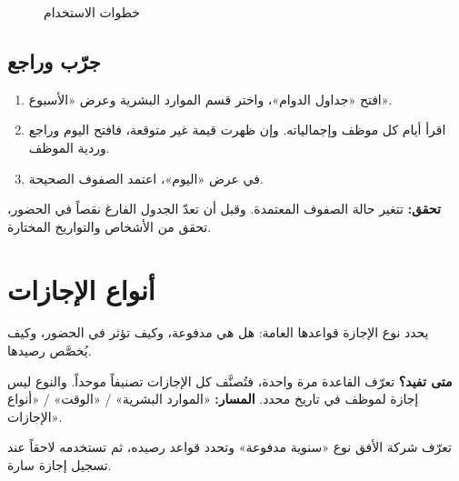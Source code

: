 \begin{figure}[H]
\centering
{}
\rclegend
\caption{خطوات الاستخدام}
\label{fig:hr-feature-timesheets-flow}
\end{figure}

\subsection{جرّب وراجع}

\begin{enumerate}
  \item افتح «جداول الدوام»، واختر قسم الموارد البشرية وعرض «الأسبوع».
  \item اقرأ أيام كل موظف وإجمالياته. وإن ظهرت قيمة غير متوقعة، فافتح اليوم وراجع وردية الموظف.
  \item في عرض «اليوم»، اعتمد الصفوف الصحيحة.
\end{enumerate}

\textbf{تحقق:} تتغير حالة الصفوف المعتمدة. وقبل أن تعدّ الجدول الفارغ نقصاً في الحضور، تحقق من الأشخاص والتواريخ المختارة.

\clearpage
\section{أنواع الإجازات}
\label{sec:hr-feature-leave-types}

يحدد نوع الإجازة قواعدها العامة: هل هي مدفوعة، وكيف تؤثر في الحضور، وكيف يُخصَّص رصيدها.

\textbf{متى تفيد؟} تعرّف القاعدة مرة واحدة، فتُصنَّف كل الإجازات تصنيفاً موحداً. والنوع ليس إجازة لموظف في تاريخ محدد. \textbf{المسار:} «الموارد البشرية» / «الوقت» / «أنواع الإجازات».

\begin{rcnote}
تعرّف شركة الأفق نوع «سنوية مدفوعة» وتحدد قواعد رصيده، ثم تستخدمه لاحقاً عند تسجيل إجازة سارة.
\end{rcnote}

